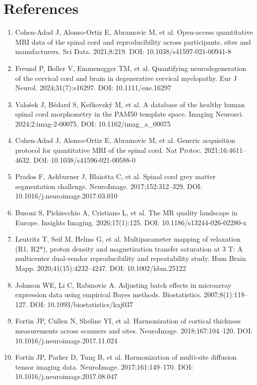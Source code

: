 \documentclass[12pt,a4paper]{article}
\begin{document}
\section*{References}

\begin{enumerate}[nosep,leftmargin=*]
\item Cohen-Adad J, Alonso-Ortiz E, Abramovic M, et al. Open-access quantitative MRI data of the spinal cord and reproducibility across participants, sites and manufacturers. Sci Data. 2021;8:219. DOI: 10.1038/s41597-021-00941-8
\item Freund P, Boller V, Emmenegger TM, et al. Quantifying neurodegeneration of the cervical cord and brain in degenerative cervical myelopathy. Eur J Neurol. 2024;31(7):e16297. DOI: 10.1111/ene.16297
\item Valo\v{s}ek J, B\'edard S, Ke\v{r}kovsk\'y M, et al. A database of the healthy human spinal cord morphometry in the PAM50 template space. Imaging Neurosci. 2024;2:imag-2-00075. DOI: 10.1162/imag\_a\_00075
\item Cohen-Adad J, Alonso-Ortiz E, Abramovic M, et al. Generic acquisition protocol for quantitative MRI of the spinal cord. Nat Protoc. 2021;16:4611--4632. DOI: 10.1038/s41596-021-00588-0
\item Prados F, Ashburner J, Blaiotta C, et al. Spinal cord grey matter segmentation challenge. NeuroImage. 2017;152:312--329. DOI: 10.1016/j.neuroimage.2017.03.010
\item Busoni S, Pichiecchio A, Cristiano L, et al. The MR quality landscape in Europe. Insights Imaging. 2026;17(1):125. DOI: 10.1186/s13244-026-02280-x
\item Leutritz T, Seif M, Helms G, et al. Multiparameter mapping of relaxation (R1, R2*), proton density and magnetization transfer saturation at 3 T: A multicenter dual-vendor reproducibility and repeatability study. Hum Brain Mapp. 2020;41(15):4232--4247. DOI: 10.1002/hbm.25122
\item Johnson WE, Li C, Rabinovic A. Adjusting batch effects in microarray expression data using empirical Bayes methods. Biostatistics. 2007;8(1):118--127. DOI: 10.1093/biostatistics/kxj037
\item Fortin JP, Cullen N, Sheline YI, et al. Harmonization of cortical thickness measurements across scanners and sites. NeuroImage. 2018;167:104--120. DOI: 10.1016/j.neuroimage.2017.11.024
\item Fortin JP, Parker D, Tun\c{c} B, et al. Harmonization of multi-site diffusion tensor imaging data. NeuroImage. 2017;161:149--170. DOI: 10.1016/j.neuroimage.2017.08.047

\end{enumerate}
\end{document}
